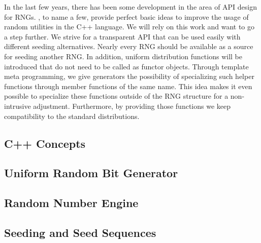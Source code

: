 \documentclass{stdlocal}
\begin{document}
  In the last few years, there has been some development in the area of API design for RNGs.
  \textcite{oneill-blog-api,oneill-blog-rd,cpp-std-seeding,cpp-std-random}, to name a few, provide perfect basic ideas to improve the usage of random utilities in the C++ language.
  We will rely on this work and want to go a step further.
  We strive for a transparent API that can be used easily with different seeding alternatives.
  Nearly every RNG should be available as a source for seeding another RNG.
  In addition, uniform distribution functions will be introduced that do not need to be called as functor objects.
  Through template meta programming, we give generators the possibility of specializing such helper functions through member functions of the same name.
  This idea makes it even possible to specialize these functions outside of the RNG structure for a non-intrusive adjustment.
  Furthermore, by providing those functions we keep compatibility to the standard distributions.



  \subsection{C++ Concepts} %
  \label{sub:c_concepts}


  \subsection{Uniform Random Bit Generator} %
  \label{sub:uniform_random_bit_generator}


  \subsection{Random Number Engine} %
  \label{sub:random_number_engine}


  \subsection{Seeding and Seed Sequences} %
  \label{sub:seeding_and_seed_sequences}

\end{document}
